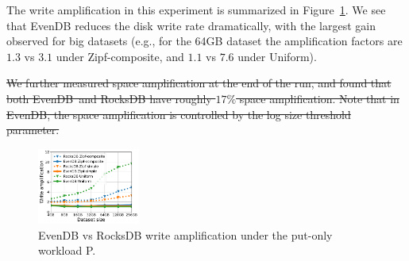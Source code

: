 \documentclass[sigplan,10pt]{acmart}
\newcommand{\inred}[1]{{\color{red}{#1}}}
\newcommand{\sys}{EvenDB}
\providecommand{\DIFdel}[1]{{\protect\color{red}\sout{#1}}}                      %
\providecommand{\DIFdelbegin}{} %
\providecommand{\DIFdelend}{} %
\providecommand{\DIFaddbeginFL}{} %
\providecommand{\DIFaddendFL}{} %
\providecommand{\DIFdelbeginFL}{} %
\providecommand{\DIFdelendFL}{} %
\begin{document}
The write amplification in this experiment is summarized in 
Figure~\ref{fig:writeamp}. We see that \sys\/ reduces the disk write rate dramatically, 
with the largest gain observed for big datasets (e.g.,  for the 64GB dataset 
the amplification factors are $1.3$ vs $3.1$ under Zipf-composite, and $1.1$ vs $7.6$ under Uniform). 

\DIFdelbegin \DIFdel{We further measured space amplification at the end of the run, and found that both \sys\ and RocksDB have roughly $17\%$ 
space amplification. Note that in \sys, the space amplification is controlled by the log size threshold parameter.
}%

\DIFdelend %

\begin{figure}[t]
	\centering
	\DIFdelbeginFL %
\DIFdelendFL \DIFaddbeginFL \includegraphics[width=0.3\textwidth]{figs/write_amp_p_line.pdf}
	\DIFaddendFL \caption{{\sys\/ vs RocksDB write amplification under the put-only workload P.}}
	\label{fig:writeamp}
\end{figure}
\end{document}
